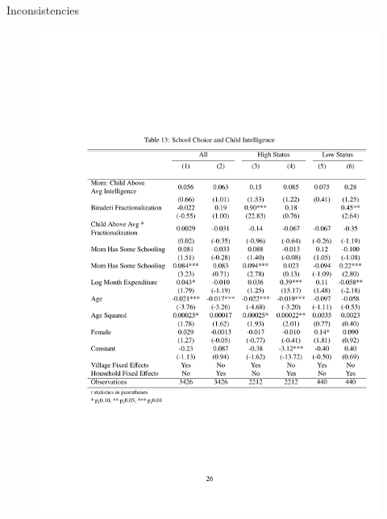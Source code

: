 \documentclass{beamer}
\begin{document}
\begin{frame}{Inconsistencies}
\begin{figure}[htb]
	\begin{center}
	\includegraphics[scale=0.65]{tables/choice_interactions.pdf}
	\end{center}
\end{figure}

\end{frame}
\end{document}

